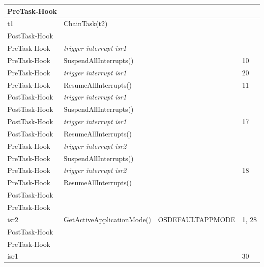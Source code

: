 \documentclass[10pt]{article}
\newlength{\Li}\settowidth{\Li}{Running}
\newlength{\Lii}\setlength{\Lii}{7cm}
\newlength{\Liiii}\setlength{\Liiii}{0.9cm}
\newlength{\Liii}\setlength{\Liii}{\textwidth} \addtolength{\Liii}{-\Li} \addtolength{\Liii}{-\Lii} \addtolength{\Liii}{-\Liiii}
\begin{document}
	\begin{supertabular}{|p{\Li}|p{\Lii}|p{\Liii}|p{\Liiii}|} \hline
	PreTask-Hook	&										&				& \\ \hline
	
	t1			& ChainTask(t2)							& 				& \\ \hline
	
	PostTask-Hook	&										&				& \\ \hline
	PreTask-Hook	& \textit{trigger interrupt isr1}					&				& \\ \hline
	PreTask-Hook	& SuspendAllInterrupts()						&				& 10 \\ \hline
	PreTask-Hook	& \textit{trigger interrupt isr1}					&				& 20 \\ \hline
	PreTask-Hook	& ResumeAllInterrupts()						&				& 11 \\ \hline
	
	PostTask-Hook	& \textit{trigger interrupt isr1}					&				& \\ \hline
	PostTask-Hook	& SuspendAllInterrupts()						&				& \\ \hline
	PostTask-Hook	& \textit{trigger interrupt isr1}					&				& 17\\ \hline
	PostTask-Hook	& ResumeAllInterrupts()						&				& \\ \hline
	PreTask-Hook	& \textit{trigger interrupt isr2}					&				& \\ \hline
	PreTask-Hook	& SuspendAllInterrupts()						&				& \\ \hline
	PreTask-Hook	& \textit{trigger interrupt isr2}					&				& 18\\ \hline
	PreTask-Hook	& ResumeAllInterrupts()						&				& \\ \hline
	
	PostTask-Hook	&										&				& \\ \hline
	PreTask-Hook	&										&				& \\ \hline
		
	isr2			& GetActiveApplicationMode()					& OSDEFAULTAPPMODE	& 1, 28 \\ \hline
	
	PostTask-Hook	&										&				& \\ \hline
	PreTask-Hook	&										&				& \\ \hline
		
	isr1			& 										& 				& 30 \\ \hline
	

\end{supertabular}
\end{document}
